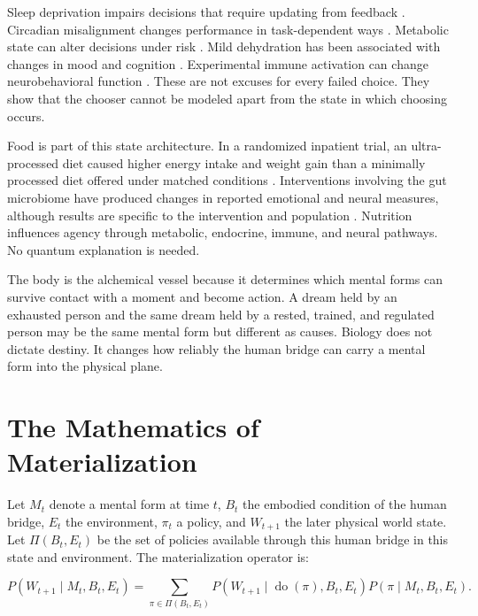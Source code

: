 \documentclass[11pt]{article}
\theoremstyle{plain}
\theoremstyle{definition}
\newcommand{\Pset}{\Pi}
\newcommand{\doop}{\operatorname{do}}
\begin{document}
Sleep deprivation impairs decisions that require updating from feedback
\citep{whitney2015sleep}. Circadian misalignment changes performance in
task-dependent ways \citep{chellappa2018circadian}. Metabolic state can alter
decisions under risk \citep{symmonds2010metabolic}. Mild dehydration has been
associated with changes in mood and cognition
\citep{ganio2011dehydration,armstrong2012dehydration}. Experimental immune activation
can change neurobehavioral function \citep{grigoleit2011endotoxin}. These are not
excuses for every failed choice. They show that the chooser cannot be modeled apart
from the state in which choosing occurs.

Food is part of this state architecture. In a randomized inpatient trial, an
ultra-processed diet caused higher energy intake and weight gain than a minimally
processed diet offered under matched conditions \citep{hall2019ultraprocessed}.
Interventions involving the gut microbiome have produced changes in reported emotional
and neural measures, although results are specific to the intervention and population
\citep{bagga2018probiotics}. Nutrition influences agency through metabolic, endocrine,
immune, and neural pathways. No quantum explanation is needed.

The body is the alchemical vessel because it determines which mental forms can survive
contact with a moment and become action. A dream held by an exhausted person and the
same dream held by a rested, trained, and regulated person may be the same mental form
but different as causes. Biology does not dictate destiny. It changes how reliably the
human bridge can carry a mental form into the physical plane.

\section{The Mathematics of Materialization}

Let \(M_t\) denote a mental form at time \(t\), \(B_t\) the embodied condition of
the human bridge, \(E_t\) the environment, \(\pi_t\) a policy, and \(W_{t+1}\) the
later physical world state. Let \(\Pset(B_t,E_t)\) be the set of policies available
through this human bridge in this state and environment. The materialization operator
is:

\begin{equation}
P(W_{t+1}\mid M_t,B_t,E_t)
=
\sum_{\pi\in\Pset(B_t,E_t)}
P\!\left(W_{t+1}\mid\doop(\pi),B_t,E_t\right)
P(\pi\mid M_t,B_t,E_t).
\label{eq:materialization}
\end{equation}
\end{document}

